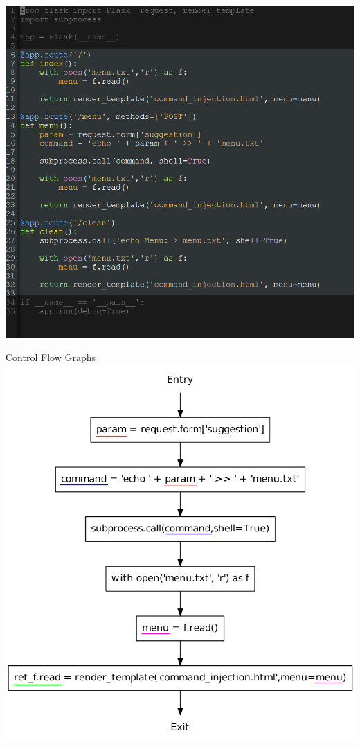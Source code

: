 \begin{frame}
  \includegraphics[height=0.8\textheight]{graphics/adaptor_flask}
\end{frame}


\begin{frame}{Control Flow Graphs}
  \center
  \includegraphics[height=0.75\textheight]{graphics/CFG_menu_underlined}
\end{frame}



